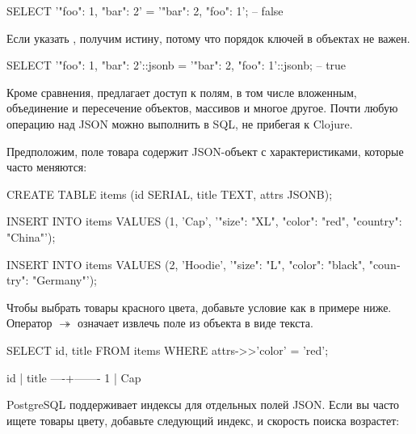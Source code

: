 \begin{english}
  \begin{sql}
SELECT '{"foo": 1, "bar": 2}' = '{"bar": 2, "foo": 1}';
-- false
  \end{sql}
\end{english}

Если указать , получим истину, потому что порядок ключей в объектах не важен.

\begin{english}
  \begin{sql}
SELECT '{"foo": 1, "bar": 2}'::jsonb =
       '{"bar": 2, "foo": 1}'::jsonb;
-- true
  \end{sql}
\end{english}

Кроме сравнения,  предлагает доступ к полям, в том числе вложенным, объединение и пересечение объектов, массивов и многое другое. Почти любую операцию над JSON можно выполнить в SQL, не прибегая к Clojure.

Предположим, поле  товара содержит JSON-объект с характеристиками, которые часто меняются:

\begin{english}
  \begin{sql}
CREATE TABLE items (id SERIAL, title TEXT, attrs JSONB);

INSERT INTO items VALUES
  (1, 'Cap', '{"size": "XL",
               "color": "red",
               "country": "China"}');

INSERT INTO items VALUES
  (2, 'Hoodie', '{"size": "L",
                  "color": "black",
                  "country": "Germany"}');
  \end{sql}
\end{english}

Чтобы выбрать товары красного цвета, добавьте условие как в примере ниже. Оператор $\twoheadrightarrow$ означает извлечь поле  из объекта в виде текста.

\begin{english}
  \begin{sql}
SELECT id, title FROM items
WHERE attrs->>'color' = 'red';

 id | title
----+-------
  1 | Cap
  \end{sql}
\end{english}

PostgreSQL поддерживает индексы для отдельных полей JSON. Если вы часто ищете товары цвету, добавьте следующий индекс, и скорость поиска возрастет:

